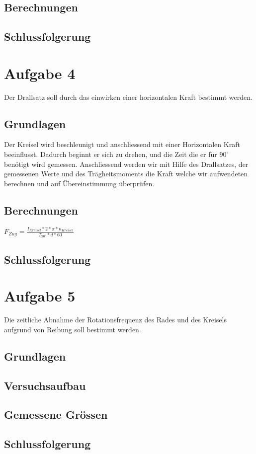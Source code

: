 \documentclass{article}
\begin{document}
\subsection{Berechnungen}
\subsection{Schlussfolgerung}

\section{Aufgabe 4}
Der Drallsatz soll durch das einwirken einer horizontalen Kraft bestimmt werden.
\subsection{Grundlagen}
Der Kreisel wird beschleunigt und anschliessend mit einer Horizontalen Kraft beeinflusst. Dadurch 
beginnt er sich zu drehen, und die Zeit die er für $90^\circ$ benötigt wird gemessen. 
Anschliessend werden wir mit Hilfe des Drallsatzes, der gemessenen Werte und des 
Trägheitsmoments die Kraft welche wir aufwendeten berechnen und auf Übereinstimmung 
überprüfen. 

\subsection{Berechnungen}
$F_{Zug}=\frac{I_{Kreisel}*2*\pi*n_{Kreisel}}{T_{90^\circ }*d*60}$
\subsection{Schlussfolgerung}

\section{Aufgabe 5}

Die zeitliche Abnahme der Rotationsfrequenz des Rades und des Kreisels aufgrund von
Reibung soll bestimmt werden.
\subsection{Grundlagen}
\subsection{Versuchsaufbau}
\subsection{Gemessene Grössen}
\subsection{Schlussfolgerung}
\end{document}
